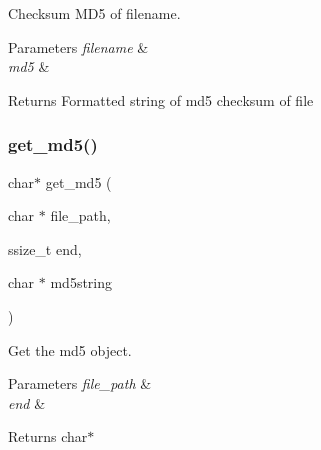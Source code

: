 Checksum M\+D5 of filename. 


\begin{DoxyParams}{Parameters}
{\em filename} & \\
\hline
{\em md5} & \\
\hline
\end{DoxyParams}
\begin{DoxyReturn}{Returns}
Formatted string of md5 checksum of file 
\end{DoxyReturn}
\mbox{\label{md5_8c_a3f712a1f36520724d253cae12dfb7fda}} 
\subsubsection{get\+\_\+md5()}
{\footnotesize\ttfamily char$\ast$ get\+\_\+md5 (\begin{DoxyParamCaption}\item[{char $\ast$}]{file\+\_\+path,  }\item[{ssize\+\_\+t}]{end,  }\item[{char $\ast$}]{md5string }\end{DoxyParamCaption})}



Get the md5 object. 


\begin{DoxyParams}{Parameters}
{\em file\+\_\+path} & \\
\hline
{\em end} & \\
\hline
\end{DoxyParams}
\begin{DoxyReturn}{Returns}
char$\ast$ 
\end{DoxyReturn}

